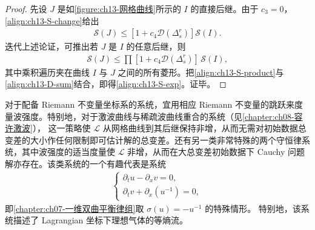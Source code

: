 \documentclass[../../main.tex]{subfiles}
\begin{document}
\begin{proof}
先设 $J$ 是如\cref{figure:ch13-网格曲线}所示的 $I$ 的直接后继。由于 $c_3=0$，\eqref{align:ch13-S-change}给出
\begin{align}
\mathscr{S}(J)\leqslant[1+c_4\mathscr{D}(\Delta_s^r)]\mathscr{S}(I).
\label{align:ch13-S-recur}
\end{align}
迭代上述论证，可推出若 $J$ 是 $I$ 的任意后继，则
\begin{align}
\mathscr{S}(J)\leqslant\prod[1+c_4\mathscr{D}(\Delta_s^r)]\,\mathscr{S}(I),
\label{align:ch13-S-product}
\end{align}
其中乘积遍历夹在曲线 $I$ 与 $J$ 之间的所有菱形。把\eqref{align:ch13-S-product}与\eqref{align:ch13-D-sum}结合，即得\eqref{align:ch13-S-exp}。证毕。
\end{proof}

对于配备 Riemann 不变量坐标系的系统，宜用相应 Riemann 不变量的跳跃来度量波强度。特别地，对于激波曲线与稀疏波曲线重合的系统（见\cref{chapter:ch08-容许激波}），
这一策略使 $\mathscr{L}$ 从网格曲线到其后继保持非增，从而无需对初始数据总变差的大小作任何限制即可估计解的总变差。还有另一类非常特殊的两个守恒律系统，其中波强度的适当度量使 $\mathscr{L}$ 非增，从而在大总变差初始数据下 Cauchy 问题解亦存在。该类系统的一个有趣代表是系统
\begin{align}
\begin{cases}
\partial_t u-\partial_x v=0,\\
\partial_t v+\partial_x(u^{-1})=0,
\end{cases}
\label{align:ch13-isothermal}
\end{align}
即\cref{chapter:ch07-一维双曲平衡律组}取 $\sigma(u)=-u^{-1}$ 的特殊情形。
特别地，该系统描述了 Lagrangian 坐标下理想气体的等熵流。
\end{document}
